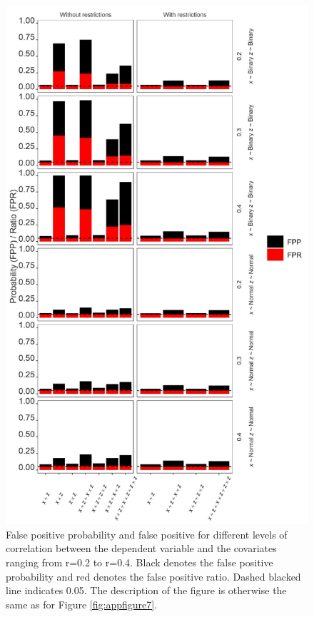 \begin{landscape}
\begin{figure}[hbt!]
\includegraphics[scale=0.7]{R/Analysis/Result/Figures/Figure2SIBon.jpeg}
\centering
\caption{False positive probability and false positive for different levels of correlation between the dependent variable and the covariates ranging from r=0.2 to r=0.4. Black denotes the false positive probability and red denotes the false positive ratio. Dashed blacked line indicates 0.05. The description of the figure is otherwise the same as for Figure \ref{fig:appfigure7}.}
\label{fig:appfigure8}
\end{figure}
\end{landscape}


